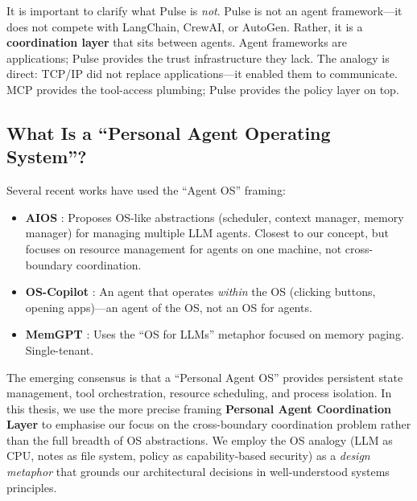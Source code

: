 It is important to clarify what Pulse is \textit{not}. Pulse is not an agent framework---it does not compete with LangChain, CrewAI, or AutoGen. Rather, it is a \textbf{coordination layer} that sits between agents. Agent frameworks are applications; Pulse provides the trust infrastructure they lack. The analogy is direct: TCP/IP did not replace applications---it enabled them to communicate. MCP \cite{anthropic2024mcp} provides the tool-access plumbing; Pulse provides the policy layer on top.

\subsection{What Is a ``Personal Agent Operating System''?}

Several recent works have used the ``Agent OS'' framing:

\begin{itemize}
    \item \textbf{AIOS} \cite{mei2025aios}: Proposes OS-like abstractions (scheduler, context manager, memory manager) for managing multiple LLM agents. Closest to our concept, but focuses on resource management for agents on one machine, not cross-boundary coordination.
    \item \textbf{OS-Copilot} \cite{wu2024oscopilot}: An agent that operates \textit{within} the OS (clicking buttons, opening apps)---an agent of the OS, not an OS for agents.
    \item \textbf{MemGPT} \cite{packer2024memgpt}: Uses the ``OS for LLMs'' metaphor focused on memory paging. Single-tenant.
\end{itemize}

The emerging consensus is that a ``Personal Agent OS'' provides persistent state management, tool orchestration, resource scheduling, and process isolation. In this thesis, we use the more precise framing \textbf{Personal Agent Coordination Layer} to emphasise our focus on the cross-boundary coordination problem rather than the full breadth of OS abstractions. We employ the OS analogy (LLM as CPU, notes as file system, policy as capability-based security) as a \textit{design metaphor} that grounds our architectural decisions in well-understood systems principles.
